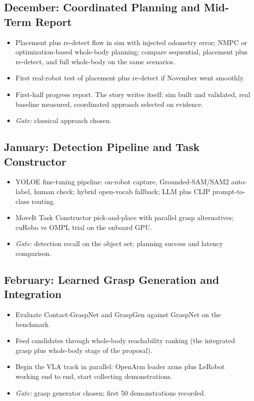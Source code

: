 \documentclass[12pt,a4paper]{article}
\begin{document}
\subsection*{December: Coordinated Planning and Mid-Term Report}
\begin{itemize}
  \item Placement plus re-detect flow in sim with injected odometry error; NMPC or
        optimization-based whole-body planning; compare sequential, placement plus
        re-detect, and full whole-body on the same scenarios.
  \item First real-robot test of placement plus re-detect if November went smoothly.
  \item First-half progress report. The story writes itself: sim built and validated, real baseline
        measured, coordinated approach selected on evidence.
  \item \textit{Gate:} classical approach chosen.
\end{itemize}

\subsection*{January: Detection Pipeline and Task Constructor}
\begin{itemize}
  \item YOLOE fine-tuning pipeline: on-robot capture, Grounded-SAM/SAM2 auto-label, human
        check; hybrid open-vocab fallback; LLM plus CLIP prompt-to-class routing.
  \item MoveIt Task Constructor pick-and-place with parallel grasp alternatives; cuRobo vs OMPL
        trial on the onboard GPU.
  \item \textit{Gate:} detection recall on the object set; planning success and latency comparison.
\end{itemize}

\subsection*{February: Learned Grasp Generation and Integration}
\begin{itemize}
  \item Evaluate Contact-GraspNet and GraspGen against GraspNet on the benchmark.
  \item Feed candidates through whole-body reachability ranking (the integrated grasp plus
        whole-body stage of the proposal).
  \item Begin the VLA track in parallel: OpenArm leader arms plus LeRobot working end to end,
        start collecting demonstrations.
  \item \textit{Gate:} grasp generator chosen; first 50 demonstrations recorded.
\end{itemize}
\end{document}

